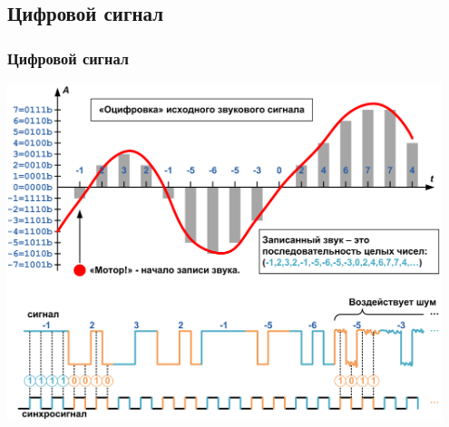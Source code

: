 \subsection{Цифровой сигнал}

\begin{frame}
    \frametitle{Цифровой сигнал}

    \begin{center}
        \includegraphics[width=0.95\textwidth]{figs/digital}
    \end{center}
\end{frame}


